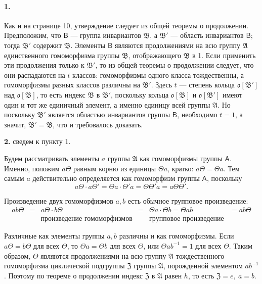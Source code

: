 \documentclass[11pt]{article}
\begin{document}
\paragraph{1.}
Как и на странице 10, утверждение следует из общей теоремы о продолжении. Предположим, что \(\mathsf B\) --- группа инвариантов \(\mathfrak B\), а \(\mathfrak B'\) --- область инвариантов \(\mathsf B\); тогда \(\mathfrak B'\) содержит \(\mathfrak B\). Элементы \(\mathsf B\) являются продолжениями на всю группу \(\mathfrak A\) единственного гомоморфизма группы \(\mathfrak B\), отображающего \(\mathfrak B\) в 1. Если применить эти продолжения только к \(\mathfrak B'\), то из общей теоремы о продолжении следует, что они распадаются на \(t\) классов: гомоморфизмы одного класса тождественны, а гомоморфизмы разных классов различны на \(\mathfrak B'\). Здесь \(t\) --- степень кольца \(\mathfrak o[\mathfrak B']\) над \(\mathfrak o[\mathfrak B]\), то есть индекс \(\mathfrak B\) в \(\mathfrak B'\), поскольку кольца \(\mathfrak o[\mathfrak B]\) и \(\mathfrak o[\mathfrak B']\) имеют один и тот же единичный элемент, а именно единицу всей группы \(\mathfrak A\). Но поскольку \(\mathfrak B'\) является областью инвариантов группы \(\mathsf B\), необходимо \(t=1\), а значит, \(\mathfrak B'=\mathfrak B\), что и требовалось доказать.

\textbf{2.} сведем к пункту 1.

Будем рассматривать элементы \(a\) группы \(\mathfrak A\) как гомоморфизмы группы \(\mathsf A\). Именно, положим \(a\Theta\) равным корню из единицы \(\Theta a\), кратко: \(a\Theta=\Theta a\). Тем самым \(a\) действительно определяется как гомоморфизм группы \(\mathsf A\), поскольку
\[
a\Theta\cdot a\Theta'=\Theta a\cdot\Theta' a=\Theta\Theta' a=a\Theta\Theta'.
\]

Произведение двух гомоморфизмов \(a,b\) есть обычное групповое произведение:
\[
\begin{array}{cccccc}
ab\Theta&=&a\Theta\cdot b\Theta&=&\Theta a\cdot\Theta b=\Theta ab&=ab\Theta\\
&&\text{произведение гомоморфизмов}&&\text{групповое произведение}&
\end{array}
\]

Различные как элементы группы \(a,b\) различны и как гомоморфизмы. Если \(a\Theta=b\Theta\) для всех \(\Theta\), то \(\Theta a=\Theta b\) для всех \(\Theta\), или \(\Theta ab^{-1}=1\) для всех \(\Theta\). Таким образом, \(\Theta\) являются продолжениями на всю группу \(\mathfrak A\) тождественного гомоморфизма циклической подгруппы \(\mathfrak Z\) группы \(\mathfrak A\), порожденной элементом \(ab^{-1}\). Поэтому по теореме о продолжении индекс \(\mathfrak Z\) в \(\mathfrak A\) равен \(h\), то есть \(\mathfrak Z=e,\ a=b\).
\end{document}
